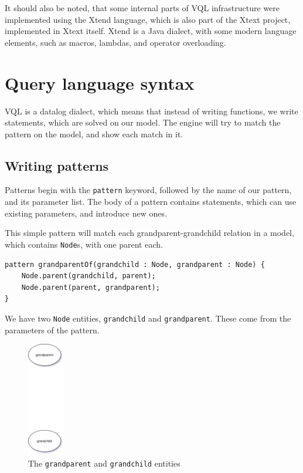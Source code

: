 \documentclass[11pt,a4paper,oneside]{report}
\begin{document}
It should also be noted, that some internal parts of VQL infrastructure were
implemented using the Xtend language, which is also part of the Xtext project,
implemented in Xtext itself. Xtend is a Java dialect, with some modern language
elements, such as macros, lambdas, and operator overloading\cite{xtend}.

\section{Query language syntax}
VQL is a datalog dialect, which means that instead of writing functions, we
write statements, which are solved on our model. The engine will try to match
the pattern on the model, and show each match in it.

\subsection{Writing patterns}
Patterns begin with the \texttt{pattern} keyword, followed by the name of our
pattern, and its parameter list. The body of a pattern contains statements,
which can use existing parameters, and introduce new ones.

This simple pattern will match each grandparent-grandchild relation in a model,
which contains \texttt{Node}s, with one parent each.

\begin{lstlisting}[caption={Grandparent-grandchild relation for \texttt{Node}s}, frame=single]
pattern grandparentOf(grandchild : Node, grandparent : Node) {
    Node.parent(grandchild, parent);
    Node.parent(parent, grandparent);
}
\end{lstlisting}

We have two \texttt{Node} entities, \texttt{grandchild} and
\texttt{grandparent}. These come from the parameters of the pattern.

\begin{figure}[!htbp]
\centering
\includegraphics[height=50mm, keepaspectratio]{figures/basic-pattern-explanation-1.png}
\caption{The \texttt{grandparent} and \texttt{grandchild} entities}
\label{fig:basic-pattern-explanation-1}
\end{figure}
\end{document}
